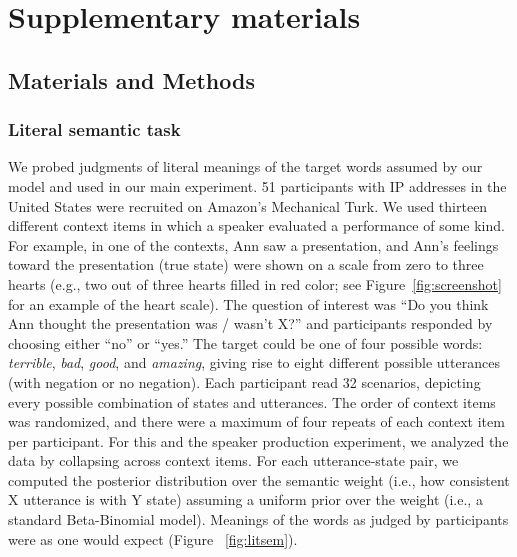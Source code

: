 \documentclass[12pt]{article}
\begin{document}
\newpage

\section*{Supplementary materials}

\subsection*{Materials and Methods}\label{materials-and-methods}

\subsubsection*{Literal semantic task}\label{literal-semantic-task}

We probed judgments of literal meanings of the target words assumed by
our model and used in our main experiment. 51 participants with IP
addresses in the United States were recruited on Amazon's Mechanical
Turk. We used thirteen different context items in which a speaker
evaluated a performance of some kind. For example, in one of the
contexts, Ann saw a presentation, and Ann's feelings toward the
presentation (true state) were shown on a scale from zero to three
hearts (e.g., two out of three hearts filled in red color; see
Figure~\ref{fig:screenshot} for an example of the heart scale). The
question of interest was \enquote{Do you think Ann thought the
presentation was / wasn't X?} and participants responded by choosing
either \enquote{no} or \enquote{yes.} The target could be one of four
possible words: \emph{terrible}, \emph{bad}, \emph{good}, and
\emph{amazing}, giving rise to eight different possible utterances (with
negation or no negation). Each participant read 32 scenarios, depicting
every possible combination of states and utterances. The order of
context items was randomized, and there were a maximum of four repeats
of each context item per participant. For this and the speaker
production experiment, we analyzed the data by collapsing across context
items. For each utterance-state pair, we computed the posterior
distribution over the semantic weight (i.e., how consistent X utterance
is with Y state) assuming a uniform prior over the weight (i.e., a
standard Beta-Binomial model). Meanings of the words as judged by
participants were as one would expect (Figure ~\ref{fig:litsem}).
\end{document}
